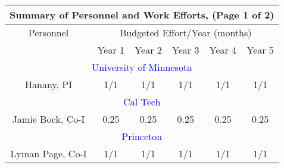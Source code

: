 \documentclass[12pt]{article}
\begin{document}
\begin{table}[h] %
\begin{center}
\begin{tabular}{|c|c|c|c|c|c|} \hline 
\multicolumn{6}{|c|}{Summary of Personnel and Work Efforts, (Page 1 of 2)}              \\ \hline
Personnel & \multicolumn{5}{c|}{Budgeted Effort/Year (months)}  \\ \cline{2-6}
                 & Year 1  & Year 2 & Year 3 & Year 4   & Year 5   \\ \hline
\multicolumn{6}{|c|}{\textcolor{blue}{University of Minnesota } }              \\ \hline
Hanany,  PI              & 1/1  & 1/1 & 1/1 & 1/1 & 1/1  \\ \hline
\multicolumn{6}{|c|}{\textcolor{blue}{Cal Tech } } \\ \hline
Jamie Bock, Co-I           &  0.25  & 0.25 & 0.25 & 0.25 & 0.25  \\ \hline
\multicolumn{6}{|c|}{\textcolor{blue}{Princeton} }  \\ \hline
Lyman Page, Co-I           & 1/1  & 1/1  & 1/1  & 1/1   & 1/1  \\ \hline

\end{tabular}
\end{center}
\end{table}
\end{document}
